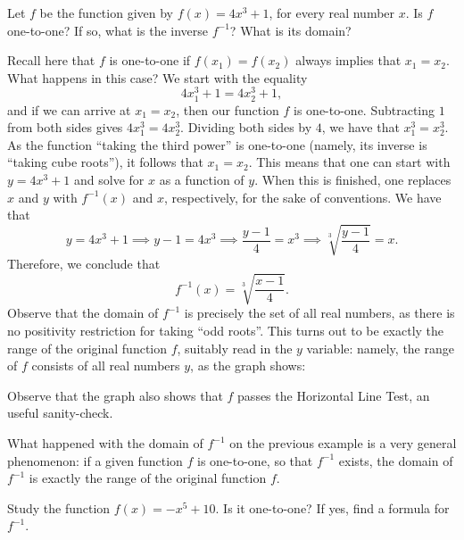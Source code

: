\documentclass[nooutcomes]{ximera}
\begin{document}
\begin{example}
  Let $f$ be the function given by $f(x) = 4x^3+1$, for every real number $x$. Is $f$ one-to-one? If so, what is the inverse $f^{-1}$? What is its domain?

  \begin{explanation}
    Recall here that $f$ is one-to-one if $f(x_1) = f(x_2)$ always implies that $x_1=x_2$. What happens in this case? We start with the equality $$4x_1^3+1 = 4x_2^3+1,$$ and if we can arrive at $x_1=x_2$, then our function $f$ is one-to-one. Subtracting $1$ from both sides gives $4x_1^3=4x_2^3$. Dividing both sides by $4$, we have that $x_1^3 = x_2^3$. As the function ``taking the third power'' is one-to-one (namely, its inverse is ``taking cube roots''), it follows that $x_1=x_2$. This means that one can start with $y=4x^3+1$ and solve for $x$ as a function of $y$. When this is finished, one replaces $x$ and $y$ with $f^{-1}(x)$ and $x$, respectively, for the sake of conventions. We have that $$y=4x^3+1 \implies y-1 = 4x^3 \implies \frac{y-1}{4} = x^3 \implies \sqrt[3]{\frac{y-1}{4}} = x.$$Therefore, we conclude that $$f^{-1}(x) = \sqrt[3]{\frac{x-1}{4}}.$$Observe that the domain of $f^{-1}$ is precisely the set of all real numbers, as there is no positivity restriction for taking ``odd roots''. This turns out to be exactly the range of the original function $f$, suitably read in the $y$ variable: namely, the range of $f$ consists of all real numbers $y$, as the graph shows:
\begin{image}
\end{image}
Observe that the graph also shows that $f$ passes the Horizontal Line Test, an useful sanity-check.
  \end{explanation}
\end{example}

\begin{callout}
  What happened with the domain of $f^{-1}$ on the previous example is a very general phenomenon: if a given function $f$ is one-to-one, so that $f^{-1}$ exists, the domain of $f^{-1}$ is exactly the range of the original function $f$.
\end{callout}

\begin{exploration}
   Study the function $f(x) = -x^5 + 10$. Is it one-to-one? If yes, find a formula for $f^{-1}$.
\end{exploration}
\end{document}
